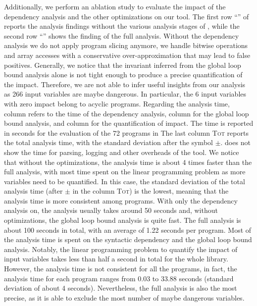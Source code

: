 Additionally, we perform an ablation study to evaluate the impact of the dependency analysis and the other optimizations on our tool.
The first row ``\nodepnoopt'' of  reports the analysis findings without the various analysis stages of , while the second row ``\timesec'' shows the finding of the full \timesec{} analysis.
Without the dependency analysis we do not apply program slicing anymore, we handle bitwise operations and array accesses with a conservative over-approximation that may lead to false positives.
Generally, we notice that the invariant inferred from the global loop bound analysis alone is not tight enough to produce a precise quantification of the impact.
Therefore, we are not able to infer useful insights from our analysis as 266 input variables are maybe dangerous.
In particular, the 6 input variables with zero impact belong to acyclic programs.
Regarding the analysis time, column \depslabel{} refers to the time of the dependency analysis, column \invlabel{} for the global loop bound analysis, and column \lplabel{} for the quantification of impact.
The time is reported in seconds for the evaluation of the 72 programs in 
The last column \textsc{Tot} reports the total analysis time, with the standard deviation after the symbol $\pm$.
 does not show the time for parsing, logging and other overheads of the tool.
We notice that without the optimizations, the analysis time is about 4 times faster than the full analysis, with most time spent on the linear programming problem as more variables need to be quantified.
In this case, the standard deviation of the total analysis time (after $\pm$ in the column \textsc{Tot}) is the lowest, meaning that the analysis time is more consistent among programs.
With only the dependency analysis on, the analysis usually takes around 50 seconds and, without optimizations, the global loop bound analysis is quite fast.
The full analysis is about 100 seconds in total, with an average of 1.22 seconds per program.
Most of the analysis time is spent on the syntactic dependency and the global loop bound analysis. Notably, the linear programming problem to quantify the impact of input variables takes less than half a second in total for the whole library.
However, the analysis time is not consistent for all the programs, in fact, the analysis time for each program ranges from 0.03 to 33.88 seconds (standard deviation of about 4 seconds).
Nevertheless, the full analysis is also the most precise, as it is able to exclude the most number of maybe dangerous variables.
%

